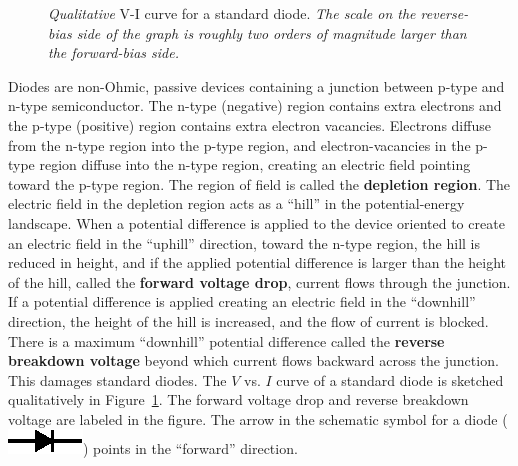 \documentclass[11pt]{article}
\begin{document}
\begin{figure}[ht]
  \begin{center}
    \caption{\emph{Qualitative} V-I curve for a standard diode. \emph{The
        scale on the reverse-bias side of the graph is roughly two orders
        of magnitude larger than the forward-bias side.}}
    \label{fig:diodevi}
  \end{center}
\end{figure}

Diodes are non-Ohmic, passive devices containing a junction between
p-type and n-type semiconductor. The n-type (negative) region contains
extra electrons and the p-type (positive) region contains extra
electron vacancies. Electrons diffuse from the n-type region into the
p-type region, and electron-vacancies in the p-type region diffuse
into the n-type region, creating an electric field pointing toward the
p-type region. The region of field is called the \textbf{depletion
  region}. The electric field in the depletion region acts as a
``hill'' in the potential-energy landscape. When a potential
difference is applied to the device oriented to create an electric
field in the ``uphill'' direction, toward the n-type region, the hill
is reduced in height, and if the applied potential difference is
larger than the height of the hill, called the \textbf{forward 
  voltage drop}, current flows through the junction.  If
a potential difference is applied creating an electric field in the
``downhill'' direction, the height of the hill is increased, and the
flow of current is blocked. There is a maximum ``downhill'' potential 
difference called the \textbf{reverse breakdown voltage} beyond which
current flows backward across the junction. This damages standard diodes.
The $V$ vs. $I$ curve of a standard diode is sketched qualitatively in
Figure~\ref{fig:diodevi}. The forward voltage drop and reverse
breakdown voltage are labeled in the figure. The arrow in the
schematic symbol for a diode (\includegraphics{diode.eps}) points in
the ``forward'' direction. 
\end{document}
